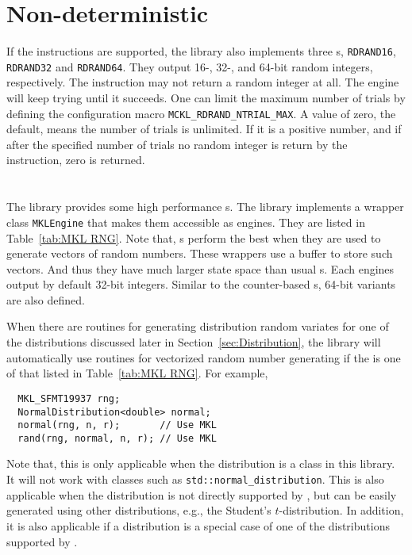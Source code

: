 \section{Non-deterministic \texorpdfstring{\protect\rng}{RNG}}
\label{sec:Non-deterministic RNG}

If the \rdrand instructions are supported, the library also implements three
\rng{}s, \verb|RDRAND16|, \verb|RDRAND32| and \verb|RDRAND64|. They output 16-,
32-, and 64-bit random integers, respectively. The \rdrand instruction may not
return a random integer at all. The \rng engine will keep trying until it
succeeds. One can limit the maximum number of trials by defining the
configuration macro \verb|MCKL_RDRAND_NTRIAL_MAX|. A value of zero, the
default, means the number of trials is unlimited. If it is a positive number,
and if after the specified number of trials no random integer is return by the
\rdrand instruction, zero is returned.

\section{\texorpdfstring{\protect\rng{} \protect\rng}{MKL RNG}}
\label{sec:MKL RNG}

The \mkl library provides some high performance \rng{}s. The library implements
a wrapper class \verb|MKLEngine| that makes them accessible as \cpp engines.
They are listed in Table~\ref{tab:MKL RNG}. Note that, \mkl{} \rng{}s perform
the best when they are used to generate vectors of random numbers. These
wrappers use a buffer to store such vectors. And thus they have much larger
state space than usual \rng{}s. Each \rng engines output by default 32-bit
integers. Similar to the counter-based \rng{}s, 64-bit variants are also
defined.

When there are \mkl routines for generating distribution random variates for
one of the distributions discussed later in Section~\ref{sec:Distribution}, the
library will automatically use \mkl routines for vectorized random number
generating if the \rng{} is one of that listed in Table~\ref{tab:MKL RNG}. For
example,
\begin{Verbatim}
  MKL_SFMT19937 rng;
  NormalDistribution<double> normal;
  normal(rng, n, r);       // Use MKL
  rand(rng, normal, n, r); // Use MKL
\end{Verbatim}
Note that, this is only applicable when the distribution is a class in this
library. It will not work with classes such as \verb|std::normal_distribution|.
This is also applicable when the distribution is not directly supported by
\mkl, but can be easily generated using other distributions, e.g., the
Student's $t$-distribution. In addition, it is also applicable if a
distribution is a special case of one of the distributions supported by \mkl.

